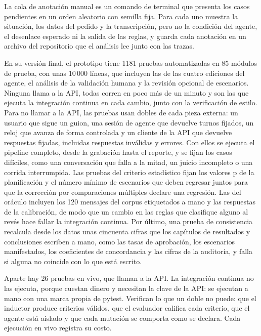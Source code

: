 \par
La cola de anotación manual es un comando de terminal que presenta los casos pendientes en un orden aleatorio con semilla fija. Para cada uno muestra la situación, los datos del pedido y la transcripción, pero no la condición del agente, el desenlace esperado ni la salida de las reglas, y guarda cada anotación en un archivo del repositorio que el análisis lee junto con las trazas.
\par

En su versión final, el prototipo tiene 1181 pruebas automatizadas en 85 módulos de prueba, con unas 10\,000 líneas, que incluyen las de las cuatro ediciones del agente, el análisis de la validación humana y la revisión opcional de escenarios. Ninguna llama a la API, todas corren en poco más de un minuto y son las que ejecuta la integración continua en cada cambio, junto con la verificación de estilo. Para no llamar a la API, las pruebas usan dobles de cada pieza externa: un usuario que sigue un guion, una sesión de agente que devuelve turnos fijados, un reloj que avanza de forma controlada y un cliente de la API que devuelve respuestas fijadas, incluidas respuestas inválidas y errores. Con ellos se ejecuta el pipeline completo, desde la grabación hasta el reporte, y se fijan los casos difíciles, como una conversación que falla a la mitad, un juicio incompleto o una corrida interrumpida. Las pruebas del criterio estadístico fijan los valores p de la planificación y el número mínimo de escenarios que deben regresar juntos para que la corrección por comparaciones múltiples declare una regresión. Las del oráculo incluyen los 120 mensajes del corpus etiquetados a mano y las respuestas de la calibración, de modo que un cambio en las reglas que clasifique alguno al revés hace fallar la integración continua. Por último, una prueba de consistencia recalcula desde los datos unas cincuenta cifras que los capítulos de resultados y conclusiones escriben a mano, como las tasas de aprobación, los escenarios manifestados, los coeficientes de concordancia y las cifras de la auditoría, y falla si alguna no coincide con lo que está escrito.
\par
Aparte hay 26 pruebas en vivo, que llaman a la API. La integración continua no las ejecuta, porque cuestan dinero y necesitan la clave de la API: se ejecutan a mano con una marca propia de pytest. Verifican lo que un doble no puede: que el inductor produce criterios válidos, que el evaluador califica cada criterio, que el agente está aislado y que cada mutación se comporta como se declara. Cada ejecución en vivo registra su costo.
